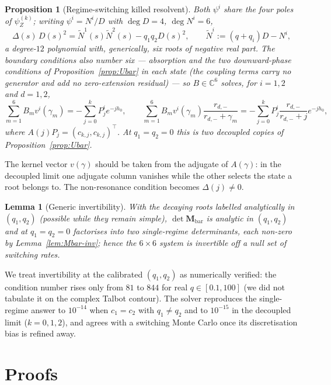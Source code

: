 \documentclass[11pt]{article}
\theoremstyle{plain}
\newtheorem{lemma}[theorem]{Lemma}
\newtheorem{proposition}[theorem]{Proposition}
\theoremstyle{definition}
\theoremstyle{remark}
\begin{document}
\begin{proposition}[Regime-switching killed resolvent]\label{prop:regime}
Both $\psi^i$ share the four poles of $\psi_Z^{(k)}$; writing $\psi^i=N^i/D$ with $\deg D=4$,
$\deg N^i=6$,
\[
\Delta(s)\,D(s)^2=\widetilde N^1(s)\widetilde N^2(s)-q_1q_2D(s)^2,
\qquad
\widetilde N^i:=(q+q_i)D-N^i,
\]
a degree-$12$ polynomial with, generically, six roots of negative real part. The boundary conditions
also number six --- absorption and the two downward-phase conditions of Proposition~\ref{prop:Ubar}
in each state (the coupling terms carry no generator and add no zero-extension residual) --- so
$B\in\mathbb C^6$ solves, for $i=1,2$ and $d=1,2$,
\[
\sum_{m=1}^{6}B_m v^i(\gamma_m) = -\!\sum_{j=0}^{k}P^i_j e^{-jh_0},
\qquad
\sum_{m=1}^{6}B_m v^i(\gamma_m)\frac{r_{d,-}}{r_{d,-}+\gamma_m}
= -\!\sum_{j=0}^{k}P^i_j\frac{r_{d,-}}{r_{d,-}+j}e^{-jh_0},
\]
where $A(j)P_j=(c_{k,j},c_{k,j})^\top$. At $q_1=q_2=0$ this is two decoupled copies of
Proposition~\ref{prop:Ubar}.
\end{proposition}

\noindent
The kernel vector $v(\gamma)$ should be taken from the adjugate of $A(\gamma)$: in the decoupled
limit one adjugate column vanishes while the other selects the state a root belongs to. The
non-resonance condition becomes $\Delta(j)\neq0$.

\begin{lemma}[Generic invertibility]\label{lem:regime-invertible}
With the decaying roots labelled analytically in $(q_1,q_2)$ (possible while they remain simple),
$\det\mathbf M_{\mathrm{bar}}$ is analytic in $(q_1,q_2)$ and at $q_1=q_2=0$ factorises into two
single-regime determinants, each non-zero by Lemma~\ref{lem:Mbar-inv}; hence the $6\times6$ system
is invertible off a null set of switching rates.
\end{lemma}

\noindent
We treat invertibility at the calibrated $(q_1,q_2)$ as numerically verified: the condition number
rises only from $81$ to $844$ for real $q\in[0.1,100]$ (we did not tabulate it on the complex
Talbot contour). The solver reproduces the single-regime answer to
$10^{-14}$ when $c_1=c_2$ with $q_1\neq q_2$ and to $10^{-15}$ in the decoupled limit ($k=0,1,2$),
and agrees with a switching Monte Carlo once its discretisation bias is refined away.

\section{Proofs}\label{app:proofs}
\end{document}
